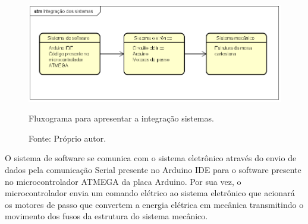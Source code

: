\begin{figure}[!htb]
\centering
\includegraphics[scale = 0.7]{figuras/integracao}
\caption{Fluxograma para apresentar a integração sistemas.}
\caption*{Fonte: Próprio autor.}
\label{fig:integracao}
\end{figure}
    
O sistema de software se comunica com o sistema eletrônico através do envio de dados pela comunicação 
Serial presente no Arduino IDE para o software presente no microcontrolador ATMEGA da placa Arduino. 
Por sua vez, o microcontrolador envia um comando elétrico ao sistema eletrônico que acionará os motores 
de passo que convertem a energia elétrica em mecânica transmitindo o movimento dos fusos da estrutura do 
sistema mecânico.